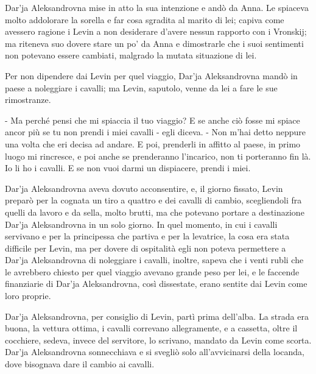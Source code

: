 Dar'ja Aleksandrovna mise in atto la sua intenzione e andò da Anna. Le spiaceva molto addolorare la sorella e far cosa sgradita al marito di lei; capiva come avessero ragione i Levin a non desiderare d'avere nessun rapporto con i Vronskij; ma riteneva suo dovere stare un po' da Anna e dimostrarle che i suoi sentimenti non potevano essere cambiati, malgrado la mutata situazione di lei. 

Per non dipendere dai Levin per quel viaggio, Dar'ja Aleksandrovna mandò in paese a noleggiare i cavalli; ma Levin, saputolo, venne da lei a fare le sue rimostranze. 

- Ma perché pensi che mi spiaccia il tuo viaggio? E se anche ciò fosse mi spiace ancor più se tu non prendi i miei cavalli - egli diceva. - Non m'hai detto neppure una volta che eri decisa ad andare. E poi, prenderli in affitto al paese, in primo luogo mi rincresce, e poi anche se prenderanno l'incarico, non ti porteranno fin là. Io li ho i cavalli. E se non vuoi darmi un dispiacere, prendi i miei. 

Dar'ja Aleksandrovna aveva dovuto acconsentire, e, il giorno fissato, Levin preparò per la cognata un tiro a quattro e dei cavalli di cambio, scegliendoli fra quelli da lavoro e da sella, molto brutti, ma che potevano portare a destinazione Dar'ja Aleksandrovna in un solo giorno. In quel momento, in cui i cavalli servivano e per la principessa che partiva e per la levatrice, la cosa era stata difficile per Levin, ma per dovere di ospitalità egli non poteva permettere a Dar'ja Aleksandrovna di noleggiare i cavalli, inoltre, sapeva che i venti rubli che le avrebbero chiesto per quel viaggio avevano grande peso per lei, e le faccende finanziarie di Dar'ja Aleksandrovna, così dissestate, erano sentite dai Levin come loro proprie. 

Dar'ja Aleksandrovna, per consiglio di Levin, partì prima dell'alba. La strada era buona, la vettura ottima, i cavalli correvano allegramente, e a cassetta, oltre il cocchiere, sedeva, invece del servitore, lo scrivano, mandato da Levin come scorta. Dar'ja Aleksandrovna sonnecchiava e si svegliò solo all'avvicinarsi della locanda, dove bisognava dare il cambio ai cavalli. 

